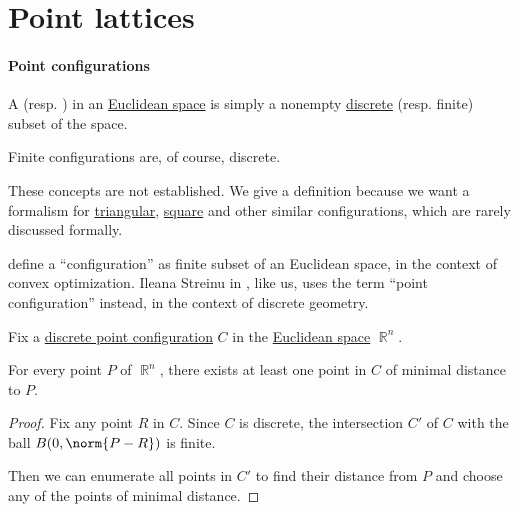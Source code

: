 \section{Point lattices}\label{sec:point_lattices}

\paragraph{Point configurations}

\begin{definition}\label{def:point_configuration}\mimprovised
  A  (resp. )  in an \hyperref[def:euclidean_space]{Euclidean space} is simply a nonempty \hyperref[def:discrete_set]{discrete} (resp. finite) subset of the space.
\end{definition}
\begin{comments}
  \item Finite configurations are, of course, discrete.

  \item These concepts are not established. We give a definition because we want a formalism for \hyperref[def:triangular_point_configuration]{triangular}, \hyperref[def:hypercubic_point_configuration]{square} and other similar configurations, which are rarely discussed formally.

  \item {} define a \enquote{configuration} as finite subset of an Euclidean space, in the context of convex optimization. Ileana Streinu in \cite[395]{RosenEtAl2018DiscreteMathematicsHandbook}, like us, uses the term \enquote{point configuration} instead, in the context of discrete geometry.
\end{comments}

\begin{proposition}\label{thm:point_configuration_finiteness}
  Fix a \hyperref[def:point_configuration]{discrete point configuration} \( C \) in the \hyperref[def:euclidean_space]{Euclidean space} \( \BbbR^n \).

  For every point \( P \) of \( \BbbR^n \), there exists at least one point in \( C \) of minimal distance to \( P \).
\end{proposition}
\begin{proof}
  Fix any point \( R \) in \( C \). Since \( C \) is discrete, the intersection \( C' \) of \( C \) with the ball \( B(0, \norm{P - R}) \) is finite.

  Then we can enumerate all points in \( C' \) to find their distance from \( P \) and choose any of the points of minimal distance.
\end{proof}

